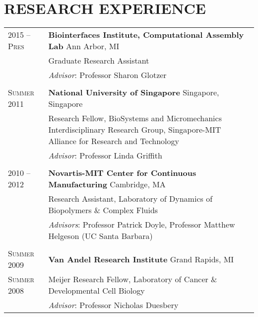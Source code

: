 \documentclass[11pt]{article}
\begin{document}
\section{RESEARCH EXPERIENCE}
\begin{longtable}{R{2.2cm} L{14.8cm}}
2015 -- \textsc{\footnotesize Pres} & \textbf{Biointerfaces Institute, Computational Assembly Lab} \hfill Ann Arbor, MI \\
& Graduate Research Assistant \\
& \textit{Advisor}: Professor Sharon Glotzer \\
\\
\textsc{\footnotesize Summer} 2011 & \textbf{National University of Singapore} \hfill Singapore, Singapore \\
& Research Fellow, BioSystems and Micromechanics Interdisciplinary Research Group, Singapore-MIT Alliance for Research and Technology \\
& \textit{Advisor}: Professor Linda Griffith \\
\\
2010 -- 2012 & \textbf{Novartis-MIT Center for Continuous Manufacturing} \hfill Cambridge, MA \\
& Research Assistant, Laboratory of Dynamics of Biopolymers \& Complex Fluids \\
& \textit{Advisors}: Professor Patrick Doyle, Professor Matthew Helgeson (UC Santa Barbara) \\
\\
\textsc{\footnotesize Summer} 2009 & \textbf{Van Andel Research Institute} \hfill Grand Rapids, MI \\
\textsc{\footnotesize Summer} 2008 & Meijer Research Fellow, Laboratory of Cancer \& Developmental Cell Biology \\
& \textit{Advisor}: Professor Nicholas Duesbery \\
\end{longtable}


\end{document}
